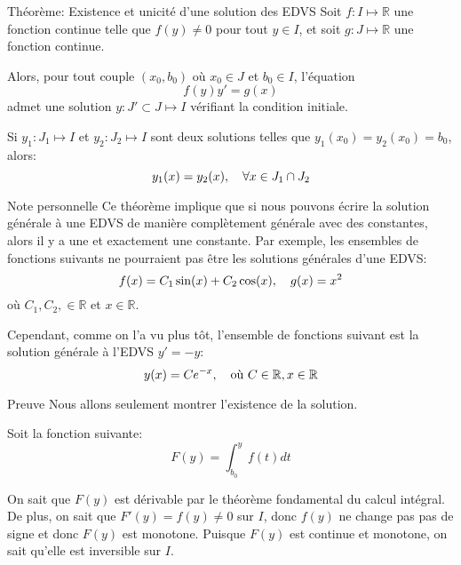 \documentclass[a4paper]{article}
\begin{document}
\begin{parag}{Théorème: Existence et unicité d'une solution des EDVS}
    Soit $f: I \mapsto \mathbb{R}$ une fonction continue telle que $f\left(y\right) \neq 0$ pour tout $y \in I$, et soit $g : J \mapsto \mathbb{R}$ une fonction continue.

     Alors, pour tout couple $\left(x_0, b_0\right)$ où $x_0 \in J$ et $b_0 \in I$, l'équation 
    \[f\left(y\right) y' = g\left(x\right)\]
    admet une solution $y : J' \subset J \mapsto I$ vérifiant la condition initiale.

     Si $y_1 : J_1 \mapsto I$ et $y_2 : J_2 \mapsto I$ sont deux solutions telles que $y_1\left(x_0\right) = y_2\left(x_0\right) = b_0$, alors: 
    \[y_1\left(x\right) = y_2\left(x\right), \mathspace \forall x \in J_1 \cap J_2\]

    \demonstrationaconnaitre

    \begin{subparag}{Note personnelle}
        Ce théorème implique que si nous pouvons écrire la solution générale à une EDVS de manière complètement générale avec des constantes, alors il y a une et exactement une constante. Par exemple, les ensembles de fonctions suivants ne pourraient pas être les solutions générales d'une EDVS: 
        \[f\left(x\right) = C_1 \sin\left(x\right) + C_2 \cos\left(x\right), \mathspace g\left(x\right) = x^2\]
        où $C_1, C_2, \in \mathbb{R}$ et $x \in \mathbb{R}$.

        Cependant, comme on l'a vu plus tôt, l'ensemble de fonctions suivant est la solution générale à l'EDVS $y' = -y$: 
        \[y\left(x\right) = Ce^{-x}, \mathspace \text{où } C \in \mathbb{R}, x \in \mathbb{R}\]
        
    \end{subparag}
    
    \begin{subparag}{Preuve}
        Nous allons seulement montrer l'existence de la solution. 

        Soit la fonction suivante: 
        \[F\left(y\right) = \int_{b_0}^{y} f\left(t\right)dt\]

        On sait que $F\left(y\right)$ est dérivable par le théorème fondamental du calcul intégral. De plus, on sait que $F'\left(y\right) = f\left(y\right) \neq 0$ sur $I$, donc $f\left(y\right)$ ne change pas pas de signe et donc $F\left(y\right)$ est monotone. Puisque $F\left(y\right)$ est continue et monotone, on sait qu'elle est inversible sur $I$. 
        

\end{subparag}
\end{parag}
\end{document}
